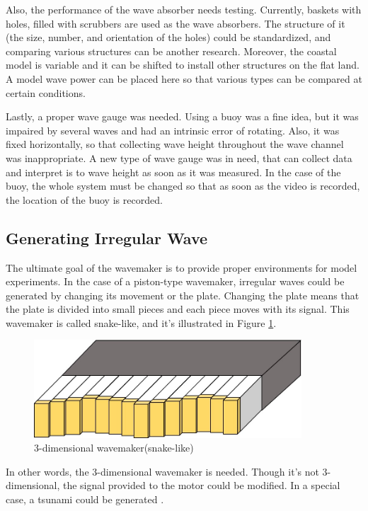 Also, the performance of the wave absorber needs testing. Currently, baskets with holes, filled with scrubbers are used as the wave absorbers. The structure of it (the size, number, and orientation of the holes) could be standardized, and comparing various structures can be another research. Moreover, the coastal model is variable and it can be shifted to install other structures on the flat land. A model wave power can be placed here so that various types can be compared at certain conditions.

Lastly, a proper wave gauge was needed. Using a buoy was a fine idea, but it was impaired by several waves and had an intrinsic error of rotating. Also, it was fixed horizontally, so that collecting wave height throughout the wave channel was inappropriate. A new type of wave gauge was in need, that can collect data and interpret is to wave height as soon as it was measured. In the case of the buoy, the whole system must be changed so that as soon as the video is recorded, the location of the buoy is recorded.



\subsection{Generating Irregular Wave}
The ultimate goal of the wavemaker is to provide proper environments for model experiments. In the case of a piston-type wavemaker, irregular waves could be generated by changing its movement or the plate. Changing the plate means that the plate is divided into small pieces and each piece moves with its signal. This wavemaker is called snake-like, and it's illustrated in Figure \ref{Snake Wave Maker}.

\begin{figure}[H]
    \centering
    \includegraphics[width=10cm]{images/Wave_Maker(Snake).jpg}
    \caption{3-dimensional wavemaker(snake-like)}
    \label{Snake Wave Maker}
\end{figure}

In other words, the 3-dimensional wavemaker is needed. Though it's not 3-dimensional, the signal provided to the motor could be modified. In a special case, a tsunami could be generated \cite{watts1998wavemaker}.
 
